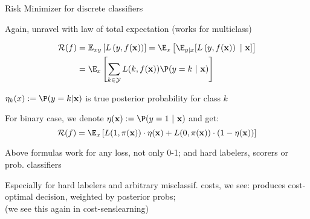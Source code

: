 \documentclass[11pt,compress,t,notes=noshow, xcolor=table]{beamer}
\begin{document}
\begin{framei}[sep=M]{Risk Minimizer for discrete classifiers}

\item Again, unravel with law of total expectation (works for multiclass)

\vspace*{-0.5cm}

\begin{align*}
  \riskf  & = \Exy\left[\Lxy\right] = \E_x \left[ \E_{y|x} [ \Lxy ~|~ \xv ] \right] \\
          & = \E_x \left[\sum_{k \in \Yspace} L(k, \fx) \P(y = k~|~ \xv)\right] 
\end{align*}

\item $\eta_k(x) := \P(y = k| \xv)$ is true posterior probability for class $k$

\item For binary case, we denote $\eta(\xv) := \P(y = 1 ~|~ \xv)$ and get: 
$$
\riskf = \E_x \left[L(1, \pix) \cdot \eta(\xv) + L(0, \pix) \cdot (1 - \eta(\xv)) \right]
$$

\item Above formulas work for any loss, not only 0-1; and hard labelers, scorers or prob. classifiers

\item Especially for hard labelers and arbitrary misclassif. costs, we see: produces cost-optimal decision, weighted by posterior probs; \\
(we see this again in cost-senslearning)




\end{framei}
\end{document}
